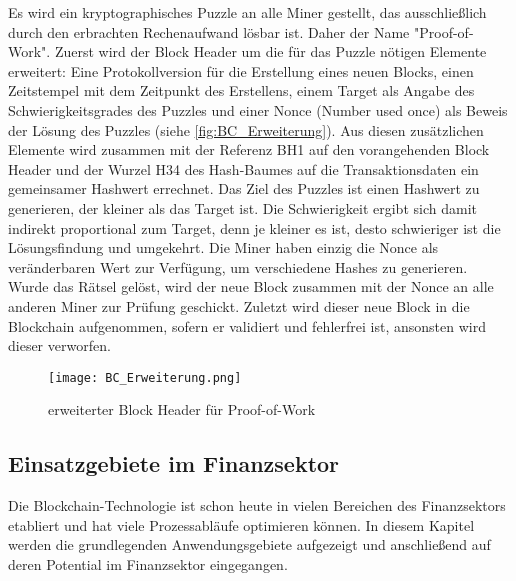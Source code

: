 Es wird ein kryptographisches Puzzle an alle Miner gestellt, das ausschlie\ss lich
durch den erbrachten Rechenaufwand lösbar ist. Daher der Name "Proof-of-Work". 
Zuerst wird der Block Header um die für das Puzzle nötigen Elemente 
erweitert: Eine Protokollversion für die Erstellung eines neuen Blocks, einen Zeitstempel mit
dem Zeitpunkt des Erstellens, einem Target als Angabe des Schwierigkeitsgrades des Puzzles
und einer Nonce (Number used once) als Beweis der Lösung des Puzzles (siehe \autoref{fig:BC_Erweiterung}).
Aus diesen zusätzlichen Elemente wird zusammen mit der Referenz BH1 auf den vorangehenden 
Block Header und der Wurzel H34 des Hash-Baumes auf die Transaktionsdaten ein gemeinsamer 
Hashwert errechnet. 
Das Ziel des Puzzles ist einen Hashwert zu generieren, der kleiner als das Target ist. Die 
Schwierigkeit ergibt sich damit indirekt proportional zum Target, denn je kleiner es ist, desto
schwieriger ist die Lösungsfindung und umgekehrt.
Die Miner haben einzig die Nonce als veränderbaren Wert zur Verfügung, um verschiedene Hashes zu generieren. 
Wurde das Rätsel gelöst, wird der neue Block zusammen mit der Nonce an alle anderen Miner zur Prüfung
geschickt.
Zuletzt wird dieser neue Block in die Blockchain aufgenommen, sofern er validiert und 
fehlerfrei ist, ansonsten wird dieser verworfen.
\cite[p.~22ff]{fill2020blockchain}


    
\begin{figure}[h]
    \begin{center}
        \texttt{[image: BC\_Erweiterung.png]}
    \end{center}
    \caption{erweiterter Block Header für Proof-of-Work}
    \label{fig:BC_Erweiterung}
\end{figure}



\newpage
\subsection{Einsatzgebiete im Finanzsektor}
Die Blockchain-Technologie ist schon heute in vielen Bereichen des Finanzsektors etabliert und hat viele 
Prozessabläufe optimieren können. In diesem Kapitel werden die grundlegenden Anwendungsgebiete aufgezeigt
und anschlie\ss end auf deren Potential im Finanzsektor eingegangen.



